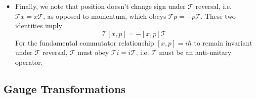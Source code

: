 \documentclass[11pt, a4paper]{article}
\newcommand{\T}{\mathcal{T}}  %
\begin{document}
\begin{itemize}
	\item Finally, we note that position doesn't change sign under $ \T $ reversal, i.e. $ \T x = x \T $, as opposed to momentum, which obeys $ \T p = - p \T $. These two identities imply
	\begin{equation*}
		\T[x, p] = - [x, p]\T
	\end{equation*}
	For the fundamental commutator relationship $ [x, p] = i\hbar $ to remain invariant under $ \T $ reversal, $ \T $ must obey $ \T i = i \T $, i.e. $ \T $ must be an anti-unitary operator.
	
\end{itemize}

\subsection{Gauge Transformations}
\end{document}
